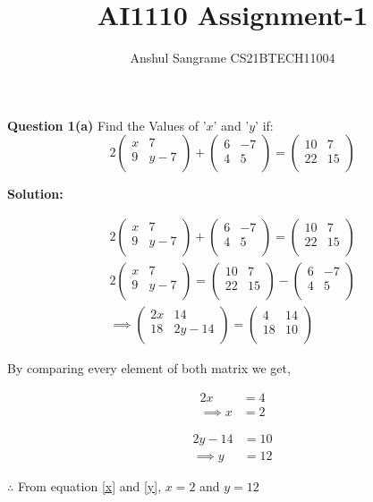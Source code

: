 \documentclass[journal,12pt,twocolumn]{IEEEtran}
\title{AI1110 Assignment-1}
\author{Anshul Sangrame CS21BTECH11004}
\newcommand{\myvec}[1]{\ensuremath{\begin{pmatrix}#1\end{pmatrix}}}
\begin{document}
\maketitle

\noindent \textbf{Question 1(a)} Find the Values of '$x $' and '$y $' if: 
$$
2
\myvec{
x & 7 \\
9 & y-7 \\
}
+
\myvec{
6 & -7 \\
4 & 5 \\
}
=
\myvec{
10 & 7 \\
22 & 15 \\
}
$$

\noindent \textbf{Solution: }


\begin{align}
2
\myvec{
x & 7 \\
9 & y-7 \\
}
+
\myvec{
6 & -7 \\
4 & 5 \\
}
=
\myvec{
10 & 7 \\
22 & 15 \\
}
\\
2
\myvec{
x & 7 \\
9 & y-7 \\
}
=
\myvec{
10 & 7 \\
22 & 15 \\
}
-
\myvec{
6 & -7 \\
4 & 5 \\
}
\\
\implies
\myvec{
2x & 14 \\
18 & 2y-14 \\
}
=
\myvec{
4 & 14\\
18 & 10\\
}
\end{align}


\noindent By comparing every element of both matrix we get,

\begin{align}
2x &= 4\\
\label{x}
\implies
x &= 2
\end{align}

\begin{align}
2y-14 &= 10\\
\label{y}
\implies
y &= 12
\end{align}


\noindent $ \therefore$ From equation \ref{x} and \ref{y},  $x = 2$ and $y=12 $
\end{document}
